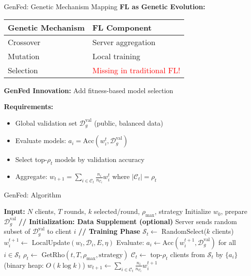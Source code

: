 \documentclass{beamer}
\begin{document}
\begin{frame}{GenFed: Genetic Mechanism Mapping}
\textbf{FL as Genetic Evolution:}
\begin{table}
\centering
\begin{tabular}{|l|l|}
\hline
\textbf{Genetic Mechanism} & \textbf{FL Component} \\
\hline
Crossover & Server aggregation \\
Mutation & Local training \\
Selection & \textcolor{red}{Missing in traditional FL!} \\
\hline
\end{tabular}
\end{table}

\vspace{0.3cm}
\textbf{GenFed Innovation:} Add fitness-based model selection

\textbf{Requirements:}
\begin{itemize}
\item Global validation set $\mathcal{D}_g^{\text{val}}$ (public, balanced data)
\item Evaluate models: $a_i = \text{Acc}(w_i^t, \mathcal{D}_g^{\text{val}})$
\item Select top-$\rho_t$ models by validation accuracy
\item Aggregate: $w_{t+1} = \sum_{i \in \mathcal{C}_t} \frac{n_i}{n_{\mathcal{C}_t}} w_i^t$ where $|\mathcal{C}_t| = \rho_t$
\end{itemize}
\end{frame}

\begin{frame}{GenFed: Algorithm}
\scriptsize
\begin{algorithmic}[1]
\STATE \textbf{Input:} $N$ clients, $T$ rounds, $k$ selected/round, $\rho_{\max}$, strategy
\STATE Initialize $w_0$, prepare $\mathcal{D}_g^{\text{val}}$
\STATE \textbf{// Initialization: Data Supplement (optional)}
    \STATE Server sends random subset of $\mathcal{D}_g^{\text{val}}$ to client $i$
\ENDFOR
\STATE \textbf{// Training Phase}
    \STATE $\mathcal{S}_t \leftarrow$ RandomSelect($k$ clients)
        \STATE $w_i^{t+1} \leftarrow$ LocalUpdate$(w_t, \mathcal{D}_i, E, \eta)$
    \ENDFOR
    \STATE Evaluate: $a_i \leftarrow \text{Acc}(w_i^{t+1}, \mathcal{D}_g^{\text{val}})$ for all $i \in \mathcal{S}_t$
    \STATE $\rho_t \leftarrow$ GetRho$(t, T, \rho_{\max}, \text{strategy})$
    \STATE $\mathcal{C}_t \leftarrow$ top-$\rho_t$ clients from $\mathcal{S}_t$ by $\{a_i\}$ (binary heap: $O(k\log k)$)
    \STATE $w_{t+1} \leftarrow \sum_{i \in \mathcal{C}_t} \frac{n_i}{n_{\mathcal{C}_t}} w_i^{t+1}$
\ENDFOR
\end{algorithmic}
\end{frame}
\end{document}
